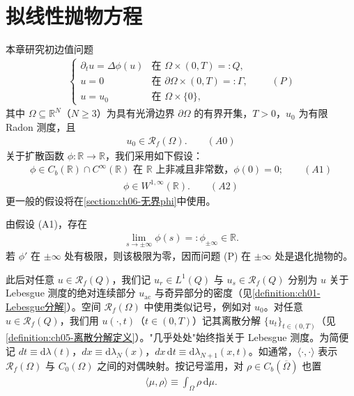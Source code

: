 \documentclass[../main.tex]{subfiles}
\begin{document}
\chapter{拟线性抛物方程}\label{chapter:ch06}

本章研究初边值问题
\begin{align*}
\begin{cases}
\partial_t u = \Delta\phi(u) & \text{在 }\Omega\times(0,T)=:Q,\\
u=0 & \text{在 }\partial\Omega\times(0,T)=:\Gamma,\\
u=u_0 & \text{在 }\Omega\times\{0\},
\end{cases}
\qquad(P)
\end{align*}
其中 $\Omega\subseteq\mathbb{R}^N$（$N\geqslant3$）为具有光滑边界 $\partial\Omega$ 的有界开集，$T>0$，$u_0$ 为有限 Radon 测度，且
\begin{align*}
u_0\in\mathscr{R}_f(\Omega). \qquad(A0)
\end{align*}
关于扩散函数 $\phi:\mathbb{R}\to\mathbb{R}$，我们采用如下假设：
\begin{align*}
\phi\in C_b(\mathbb{R})\cap C^\infty(\mathbb{R}) \text{ 在 }\mathbb{R}\text{ 上非减且非常数，}\phi(0)=0; \qquad(A1)
\end{align*}
\begin{align*}
\phi\in W^{1,\infty}(\mathbb{R}). \qquad(A2)
\end{align*}
更一般的假设将在\cref{section:ch06-无界phi}中使用。

由假设 (A1)，存在
\begin{align}
\lim_{s\to\pm\infty}\phi(s)=:\phi_{\pm\infty}\in\mathbb{R}. \label{align:ch6-6.1}
\end{align}
若 $\phi'$ 在 $\pm\infty$ 处有极限，则该极限为零，因而问题 (P) 在 $\pm\infty$ 处是退化抛物的。

此后对任意 $u\in\mathscr{R}_f(Q)$，我们记 $u_r\in L^1(Q)$ 与 $u_s\in\mathscr{R}_f(Q)$ 分别为 $u$ 关于 Lebesgue 测度的绝对连续部分 $u_{\mathrm{ac}}$ 与奇异部分的密度（见\cref{definition:ch01-Lebesgue分解}）。空间 $\mathscr{R}_f(\Omega)$ 中使用类似记号，例如对 $u_0$。对任意 $u\in\mathscr{R}_f(Q)$，我们用 $u(\cdot,t)$（$t\in(0,T)$）记其离散分解 $\{u_t\}_{t\in(0,T)}$（见\cref{definition:ch05-离散分解定义}）。"几乎处处"始终指关于 Lebesgue 测度。为简便记 $dt\equiv\mathrm{d}\lambda(t)$，$dx\equiv\mathrm{d}\lambda_N(x)$，$dx\,\mathrm{d}t\equiv\mathrm{d}\lambda_{N+1}(x,t)$。如通常，$\langle\cdot,\cdot\rangle$ 表示 $\mathscr{R}_f(\Omega)$ 与 $C_0(\Omega)$ 之间的对偶映射。按记号滥用，对 $\rho\in C_b(\overline\Omega)$ 也置
\begin{align*}
\langle\mu,\rho\rangle\equiv\int_\Omega\rho\,\mathrm{d}\mu.
\end{align*}








\end{document}
